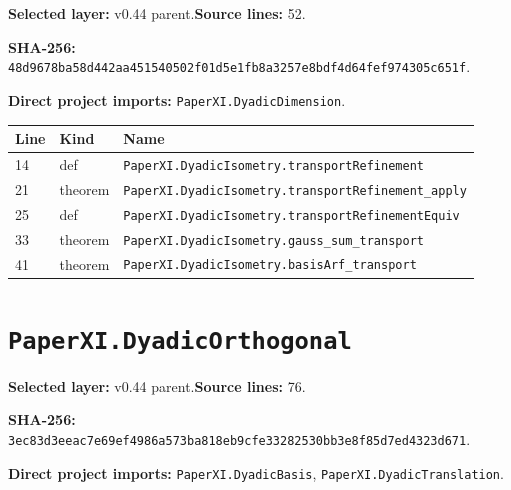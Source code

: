 \documentclass[10pt,oneside]{book}
\begin{document}
\textbf{Selected layer:} v0.44 parent.\quad\textbf{Source lines:} 52.\par\textbf{SHA-256:} {\scriptsize\nolinkurl{48d9678ba58d442aa451540502f01d5e1fb8a3257e8bdf4d64fef974305c651f}}.


\textbf{Direct project imports:} \nolinkurl{PaperXI.DyadicDimension}.

\begin{longtable}{@{}p{}p{}p{}@{}}\toprule Line&Kind&Name\\\midrule\endhead

14&def&\nolinkurl{PaperXI.DyadicIsometry.transportRefinement}\\

21&theorem&\nolinkurl{PaperXI.DyadicIsometry.transportRefinement_apply}\\

25&def&\nolinkurl{PaperXI.DyadicIsometry.transportRefinementEquiv}\\

33&theorem&\nolinkurl{PaperXI.DyadicIsometry.gauss_sum_transport}\\

41&theorem&\nolinkurl{PaperXI.DyadicIsometry.basisArf_transport}\\

\bottomrule\end{longtable}

\section{\texorpdfstring{\nolinkurl{PaperXI.DyadicOrthogonal}}{PaperXI.DyadicOrthogonal}}\label{module:PaperXI.DyadicOrthogonal}

\textbf{Selected layer:} v0.44 parent.\quad\textbf{Source lines:} 76.\par\textbf{SHA-256:} {\scriptsize\nolinkurl{3ec83d3eeac7e69ef4986a573ba818eb9cfe33282530bb3e8f85d7ed4323d671}}.

\textbf{Direct project imports:} \nolinkurl{PaperXI.DyadicBasis}, \nolinkurl{PaperXI.DyadicTranslation}.
\end{document}
